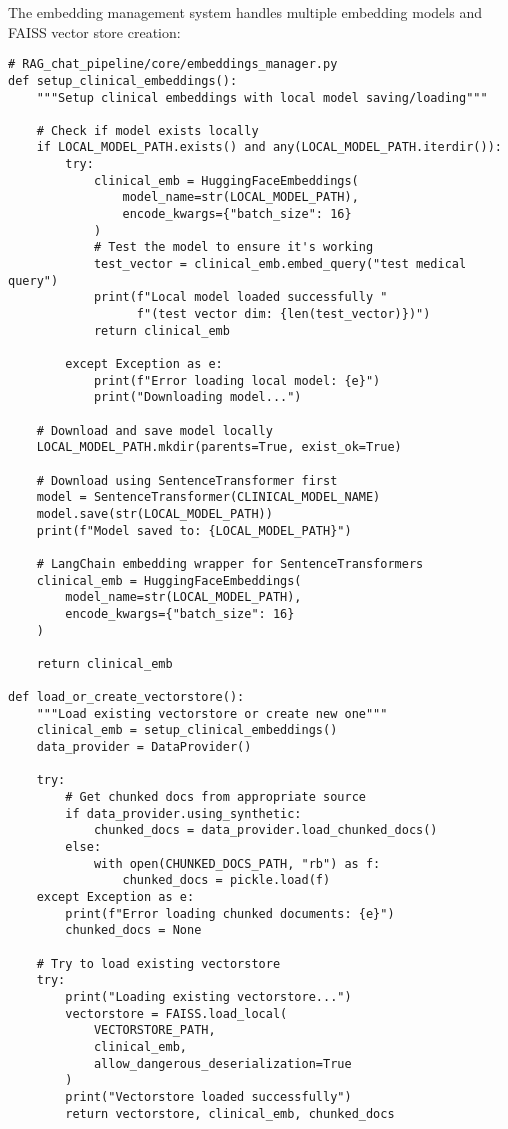 The embedding management system handles multiple embedding models and FAISS vector store creation:

\begin{verbatim}
# RAG_chat_pipeline/core/embeddings_manager.py
def setup_clinical_embeddings():
    """Setup clinical embeddings with local model saving/loading"""
    
    # Check if model exists locally
    if LOCAL_MODEL_PATH.exists() and any(LOCAL_MODEL_PATH.iterdir()):
        try:
            clinical_emb = HuggingFaceEmbeddings(
                model_name=str(LOCAL_MODEL_PATH),
                encode_kwargs={"batch_size": 16}
            )
            # Test the model to ensure it's working
            test_vector = clinical_emb.embed_query("test medical query")
            print(f"Local model loaded successfully "
                  f"(test vector dim: {len(test_vector)})")
            return clinical_emb
        
        except Exception as e:
            print(f"Error loading local model: {e}")
            print("Downloading model...")
    
    # Download and save model locally
    LOCAL_MODEL_PATH.mkdir(parents=True, exist_ok=True)
    
    # Download using SentenceTransformer first
    model = SentenceTransformer(CLINICAL_MODEL_NAME)
    model.save(str(LOCAL_MODEL_PATH))
    print(f"Model saved to: {LOCAL_MODEL_PATH}")
    
    # LangChain embedding wrapper for SentenceTransformers
    clinical_emb = HuggingFaceEmbeddings(
        model_name=str(LOCAL_MODEL_PATH),
        encode_kwargs={"batch_size": 16}
    )
    
    return clinical_emb

def load_or_create_vectorstore():
    """Load existing vectorstore or create new one"""
    clinical_emb = setup_clinical_embeddings()
    data_provider = DataProvider()
    
    try:
        # Get chunked docs from appropriate source
        if data_provider.using_synthetic:
            chunked_docs = data_provider.load_chunked_docs()
        else:
            with open(CHUNKED_DOCS_PATH, "rb") as f:
                chunked_docs = pickle.load(f)
    except Exception as e:
        print(f"Error loading chunked documents: {e}")
        chunked_docs = None
    
    # Try to load existing vectorstore
    try:
        print("Loading existing vectorstore...")
        vectorstore = FAISS.load_local(
            VECTORSTORE_PATH,
            clinical_emb,
            allow_dangerous_deserialization=True
        )
        print("Vectorstore loaded successfully")
        return vectorstore, clinical_emb, chunked_docs
    

\end{verbatim}
